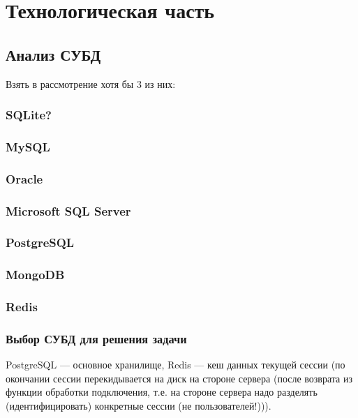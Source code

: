 \section{Технологическая часть}




\subsection{Анализ СУБД}

Взять в рассмотрение хотя бы 3 из них: 

\subsubsection{SQLite?}

\subsubsection{MySQL}

\subsubsection{Oracle}

\subsubsection{Microsoft SQL Server}

\subsubsection{PostgreSQL}

\subsubsection{MongoDB}

\subsubsection{Redis}

\subsubsection{Выбор СУБД для решения задачи}

PostgreSQL --- основное хранилище, Redis --- кеш данных текущей сессии (по окончании сессии перекидывается на диск на стороне сервера (после возврата из функции обработки подключения, т.е. на стороне сервера надо разделять (идентифицировать) конкретные сессии (не пользователей!))).




